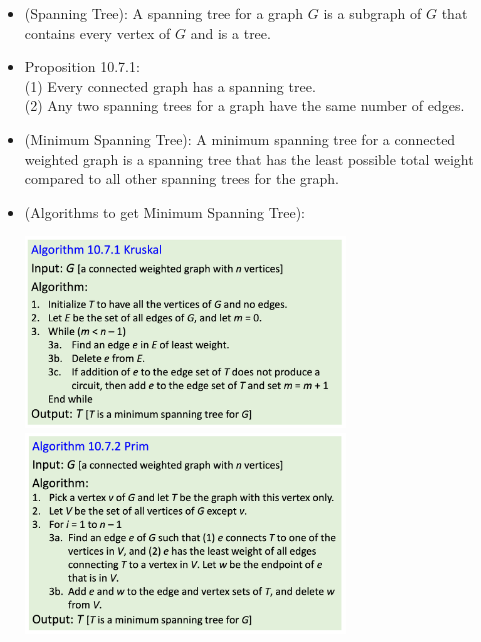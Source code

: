 \documentclass{article}
\begin{document}
\begin{itemize}
\begin{center}
        \end{center}
    \item (Spanning Tree): A spanning tree for a graph $G$ is a subgraph of $G$ that contains every vertex of $G$ and is a tree.
    \item Proposition 10.7.1:
        \\ \hspace*{3mm} (1) Every connected graph has a spanning tree.
        \\ \hspace*{3mm} (2) Any two spanning trees for a graph have the same number of edges.
    \item (Minimum Spanning Tree): A minimum spanning tree for a connected weighted graph is a spanning tree that has the least possible total weight compared to all other spanning trees for the graph.
    \item (Algorithms to get Minimum Spanning Tree):
        \begin{center}
            \includegraphics[width=8.5cm]{images/kruskal_algorithm.png}
            \includegraphics[width=8.5cm]{images/prim_algorithm.png}
        \end{center}
\end{itemize}
\end{document}
